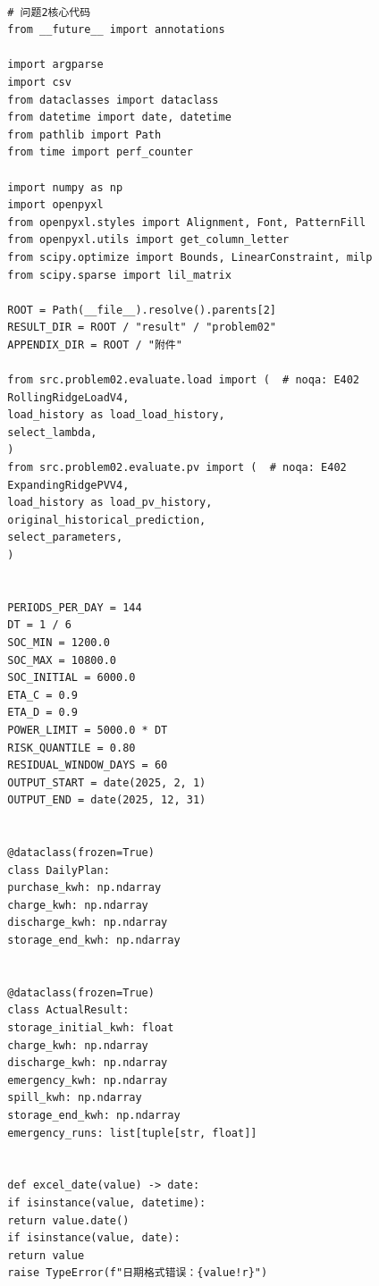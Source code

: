 \documentclass[UTF8]{ctexart}
\begin{document}
    \begin{verbatim}
        
        # 问题2核心代码
        from __future__ import annotations
        
        import argparse
        import csv
        from dataclasses import dataclass
        from datetime import date, datetime
        from pathlib import Path
        from time import perf_counter
        
        import numpy as np
        import openpyxl
        from openpyxl.styles import Alignment, Font, PatternFill
        from openpyxl.utils import get_column_letter
        from scipy.optimize import Bounds, LinearConstraint, milp
        from scipy.sparse import lil_matrix
        
        ROOT = Path(__file__).resolve().parents[2]
        RESULT_DIR = ROOT / "result" / "problem02"
        APPENDIX_DIR = ROOT / "附件"
        
        from src.problem02.evaluate.load import (  # noqa: E402
        RollingRidgeLoadV4,
        load_history as load_load_history,
        select_lambda,
        )
        from src.problem02.evaluate.pv import (  # noqa: E402
        ExpandingRidgePVV4,
        load_history as load_pv_history,
        original_historical_prediction,
        select_parameters,
        )
        
        
        PERIODS_PER_DAY = 144
        DT = 1 / 6
        SOC_MIN = 1200.0
        SOC_MAX = 10800.0
        SOC_INITIAL = 6000.0
        ETA_C = 0.9
        ETA_D = 0.9
        POWER_LIMIT = 5000.0 * DT
        RISK_QUANTILE = 0.80
        RESIDUAL_WINDOW_DAYS = 60
        OUTPUT_START = date(2025, 2, 1)
        OUTPUT_END = date(2025, 12, 31)
        
        
        @dataclass(frozen=True)
        class DailyPlan:
        purchase_kwh: np.ndarray
        charge_kwh: np.ndarray
        discharge_kwh: np.ndarray
        storage_end_kwh: np.ndarray
        
        
        @dataclass(frozen=True)
        class ActualResult:
        storage_initial_kwh: float
        charge_kwh: np.ndarray
        discharge_kwh: np.ndarray
        emergency_kwh: np.ndarray
        spill_kwh: np.ndarray
        storage_end_kwh: np.ndarray
        emergency_runs: list[tuple[str, float]]
        
        
        def excel_date(value) -> date:
        if isinstance(value, datetime):
        return value.date()
        if isinstance(value, date):
        return value
        raise TypeError(f"日期格式错误：{value!r}")
        

\end{verbatim}
\end{document}
